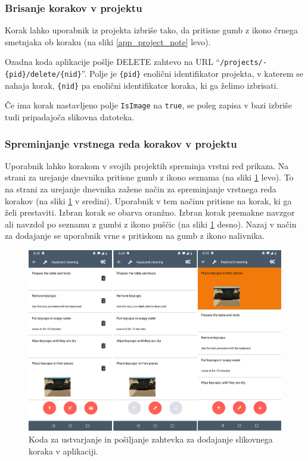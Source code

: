 \documentclass[a4paper, 12pt]{book}
\begin{document}
\subsubsection{Brisanje korakov v projektu}

Korak lahko uporabnik iz projekta izbriše tako, da pritisne gumb z ikono črnega smetnjaka ob koraku (na sliki \ref{app_project_note} levo).

Ozadna koda aplikacije pošlje DELETE zahtevo na URL \enquote{\texttt{/projects/-\\\{pid\}/delete/\{nid\}}}.
Polje je \texttt{\{pid\}} enolični identifikator projekta, v katerem se nahaja korak, \texttt{\{nid\}} pa enolični identifikator koraka, ki ga želimo izbrisati.

Če ima korak nastavljeno polje \texttt{IsImage} na \texttt{true}, se poleg zapisa v bazi izbriše tudi pripadajoča slikovna datoteka.



\subsubsection{Spreminjanje vrstnega reda korakov v projektu}

Uporabnik lahko korakom v svojih projektih spreminja vrstni red prikaza.
Na strani za urejanje dnevnika pritisne gumb z ikono seznama (na sliki \ref{app_ordering} levo).
To na strani za urejanje dnevnika zažene način za spreminjanje vrstnega reda korakov (na sliki \ref{app_ordering} v sredini).
Uporabnik v tem načinu pritisne na korak, ki ga želi prestaviti.
Izbran korak se obarva oranžno.
Izbran korak premakne navzgor ali navzdol po seznamu z gumbi z ikono puščic (na sliki \ref{app_ordering} desno).
Nazaj v način za dodajanje se uporabnik vrne s pritiskom na gumb z ikono nalivnika.

\begin{figure}[H]
\begin{center}
	\includegraphics[width=13.5cm]{app_ordering}
\end{center}
	\caption{Koda za ustvarjanje in pošiljanje zahtevka za dodajanje slikovnega koraka v aplikaciji.}
\label{app_ordering}
\end{figure}
\end{document}
